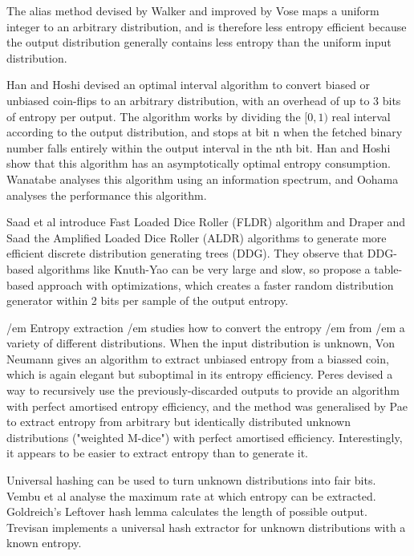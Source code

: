 \documentclass[12pt]{article}
\begin{document}
The alias method devised by Walker \cite{walker1977efficient} and improved by Vose \cite{vose91} maps a uniform integer to an arbitrary distribution, and is therefore less entropy efficient because the output distribution generally contains less entropy than the uniform input distribution.

Han and Hoshi \cite{han97} devised an optimal interval algorithm to convert biased or unbiased coin-flips to an arbitrary distribution, with an overhead of up to 3 bits of entropy per output.  The algorithm works by dividing the $[0,1)$ real interval according to the output distribution, and stops at bit n when the fetched binary number falls entirely within the output interval in the nth bit. Han and Hoshi show that this algorithm has an asymptotically optimal entropy consumption. 
Wanatabe \cite{wanatabe20} analyses this algorithm using an information spectrum, and Oohama \cite{oohama11, oohama2020performance} analyses the performance this algorithm.

Saad et al \cite{saad2020fldr} introduce Fast Loaded Dice Roller (FLDR) algorithm and Draper and Saad \cite{draper2025efficient} the Amplified Loaded Dice Roller (ALDR) algorithms to generate more efficient discrete distribution generating trees (DDG). They observe that DDG-based algorithms like Knuth-Yao can be very large and slow, so propose a table-based approach with optimizations, which creates a faster random distribution generator within 2 bits per sample of the output entropy.

/em Entropy extraction /em studies how to convert the entropy /em from /em a variety of different distributions. When the input distribution is unknown, Von Neumann \cite{neumann51} gives an algorithm to extract unbiased entropy from a biassed coin, which is again elegant but suboptimal in its entropy efficiency. Peres \cite{peres1992iterating} devised a way to recursively use the previously-discarded outputs to provide an algorithm with perfect amortised entropy efficiency, and the method was generalised by Pae \cite{pae15} to extract entropy from arbitrary but identically distributed unknown distributions ("weighted M-dice") with perfect amortised efficiency. Interestingly, it appears to be easier to extract entropy than to generate it.

Universal hashing can be used to turn unknown distributions into fair bits. Vembu et al \cite{vembu95} analyse the maximum rate at which entropy can be extracted. Goldreich's Leftover hash lemma \cite{goldreich2004foundations} calculates the length of possible output. Trevisan \cite{trevisan2001extractors} implements a universal hash extractor for unknown distributions with a known entropy. 
\end{document}
